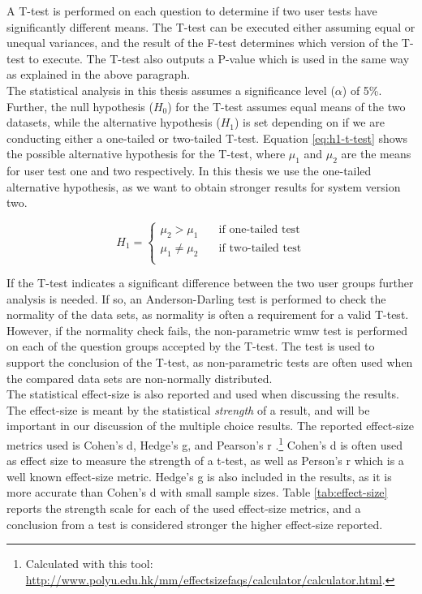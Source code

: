 A T-test \cite{walpole1993} is performed on each question to determine if two user tests have significantly different means. The T-test can be executed either assuming equal or unequal variances, and the result of the F-test determines which version of the T-test to execute. The T-test also outputs a P-value which is used in the same way as explained in the above paragraph. \\

The statistical analysis in this thesis assumes a significance level ($\alpha$) of 5\%. Further, the null hypothesis ($H_0$) for the T-test assumes equal means of the two datasets, while the alternative hypothesis ($H_1$) is set depending on if we are conducting either a one-tailed or two-tailed T-test. Equation \ref{eq:h1-t-test} shows the possible alternative hypothesis for the T-test, where $\mu_{1}$ and $\mu_{2}$ are the means for user test one and two respectively. In this thesis we use the one-tailed alternative hypothesis, as we want to obtain stronger results for system version two.

\begin{equation} \label{eq:h1-t-test}
   H_1 =
    \begin{cases}
        \mu_{2} > \mu_{1} & \quad \text{if one-tailed test}\\
        \mu_{1} \neq \mu_{2} & \quad \text{if two-tailed test}\\
    \end{cases}
\end{equation}

If the T-test indicates a significant difference between the two user groups further analysis is needed. If so, an Anderson-Darling test \cite{razali2011} is performed to check the normality of the data sets, as normality is often a requirement for a valid T-test. However, if the normality check fails, the non-parametric \gls{wmw} test \cite{hodges2005} is performed on each of the question groups accepted by the T-test. The test is used to support the conclusion of the T-test, as non-parametric tests are often used when the compared data sets are non-normally distributed. \\

The statistical effect-size is also reported and used when discussing the results. The effect-size is meant by the statistical \textit{strength} of a result, and will be important in our discussion of the multiple choice results. The reported effect-size metrics used is Cohen's d, Hedge's g, and Pearson's r \cite{cumming2013}.\footnote{Calculated with this tool: \url{http://www.polyu.edu.hk/mm/effectsizefaqs/calculator/calculator.html}.} Cohen's d is often used as effect size to measure the strength of a t-test, as well as Person's r which is a well known effect-size metric. Hedge's g is also included in the results, as it is more accurate than Cohen's d with small sample sizes. Table \ref{tab:effect-size} reports the strength scale for each of the used effect-size metrics, and a conclusion from a test is considered stronger the higher effect-size reported. \\

